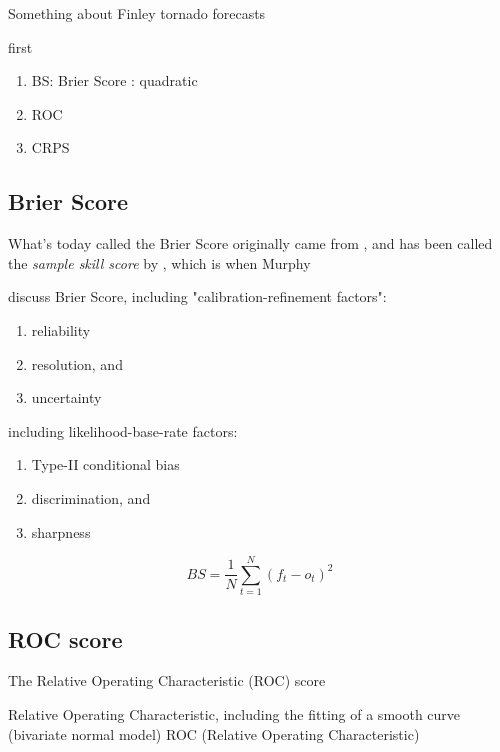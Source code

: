 \documentclass[logos,parttoc,morelanguage=french,morelanguage=italian]{orsay-memoire}
\begin{document}
Something about Finley tornado forecasts 

first
\cite{Teutschbein2012BiasMethods}



	\begin{enumerate}
		\item BS: Brier Score : quadratic 
        \item ROC
        \item CRPS
     \end{enumerate}

\subsection{Brier Score}


What's today called the Brier Score originally came from \cite{brier1950verification}, and has been called the \textit{sample skill score} by \cite{Murphy1974sample}, which is when Murphy 


discuss Brier Score, including "calibration-refinement factors":
	\begin{enumerate}
      \item reliability
      \item resolution, and
      \item uncertainty
    \end {enumerate}

including likelihood-base-rate factors:
	\begin{enumerate}
       \item Type-II conditional bias
       \item discrimination, and
       \item sharpness
    \end {enumerate}



\begin{equation}
BS = \frac{1}{N}\sum_{t=1}^{N}\left ( f_t - o_t \right )^2
\end{equation}

\subsection{ROC score}

The Relative Operating Characteristic (ROC) score 

Relative Operating Characteristic, including the fitting of a smooth curve (bivariate normal model)
ROC (Relative Operating Characteristic)
\end{document}
